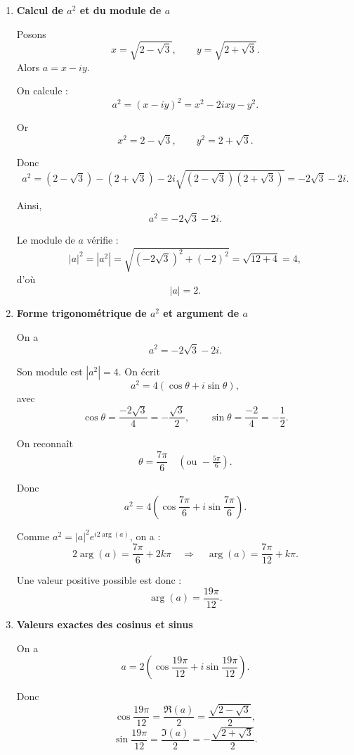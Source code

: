 \documentclass[12pt,a4paper]{article}
\begin{document}
\begin{enumerate}
    \item \textbf{Calcul de $a^2$ et du module de $a$}

    Posons 
    \[
    x = \sqrt{2 - \sqrt{3}}, \qquad y = \sqrt{2 + \sqrt{3}}.
    \]
    Alors $a = x - iy$.

    On calcule :
    \[
    a^2 = (x - iy)^2 = x^2 - 2ixy - y^2.
    \]

    Or
    \[
    x^2 = 2 - \sqrt{3}, \qquad y^2 = 2 + \sqrt{3}.
    \]

    Donc
    \[
    a^2 = (2 - \sqrt{3}) - (2 + \sqrt{3}) - 2i\sqrt{(2-\sqrt3)(2+\sqrt3)}
    = -2\sqrt{3} - 2i.
    \]

    Ainsi,
    \[
    \boxed{a^2 = -2\sqrt{3} - 2i.}
    \]

    Le module de $a$ vérifie :
    \[
    |a|^2 = |a^2| = \sqrt{(-2\sqrt3)^2 + (-2)^2} = \sqrt{12 + 4} = 4,
    \]
    d'où
    \[
    \boxed{|a| = 2.}
    \]

    \item \textbf{Forme trigonométrique de $a^2$ et argument de $a$}

    On a
    \[
    a^2 = -2\sqrt{3} - 2i.
    \]

    Son module est $|a^2| = 4$. On écrit
    \[
    a^2 = 4(\cos\theta + i\sin\theta),
    \]
    avec
    \[
    \cos\theta = \frac{-2\sqrt3}{4} = -\frac{\sqrt3}{2}, 
    \qquad
    \sin\theta = \frac{-2}{4} = -\frac{1}{2}.
    \]

    On reconnaît
    \[
    \theta = \frac{7\pi}{6} \quad (\text{ou } -\tfrac{5\pi}{6}).
    \]

    Donc
    \[
    \boxed{a^2 = 4\left(\cos\frac{7\pi}{6} + i\sin\frac{7\pi}{6}\right).}
    \]

    Comme $a^2 = |a|^2 e^{i2\arg(a)}$, on a :
    \[
    2\arg(a) = \frac{7\pi}{6} + 2k\pi
    \quad\Rightarrow\quad
    \arg(a) = \frac{7\pi}{12} + k\pi.
    \]

    Une valeur positive possible est donc :
    \[
    \boxed{\arg(a) = \frac{19\pi}{12}.}
    \]

    \item \textbf{Valeurs exactes des cosinus et sinus}

    On a 
    \[
    a = 2\left(\cos\frac{19\pi}{12} + i\sin\frac{19\pi}{12}\right).
    \]

    Donc
    \[
    \cos\frac{19\pi}{12} = \frac{\Re(a)}{2} = \frac{\sqrt{2-\sqrt3}}{2}, 
    \]
    \[
    \sin\frac{19\pi}{12} = \frac{\Im(a)}{2} = -\frac{\sqrt{2+\sqrt3}}{2}.
    \]


\end{enumerate}
\end{document}
